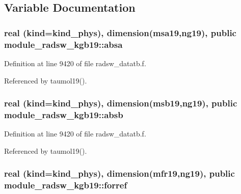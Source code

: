 \subsection{Variable Documentation}
\subsubsection[{\texorpdfstring{absa}{absa}}]{\setlength{\rightskip}{0pt plus 5cm}real (kind=kind\+\_\+phys), dimension({\bf msa19},ng19), public module\+\_\+radsw\+\_\+kgb19\+::absa}\hypertarget{namespacemodule__radsw__kgb19_ad9a6fc80122a2f06d9f2277d74e00c85}{}\label{namespacemodule__radsw__kgb19_ad9a6fc80122a2f06d9f2277d74e00c85}


Definition at line 9420 of file radsw\+\_\+datatb.\+f.



Referenced by taumol19().

\subsubsection[{\texorpdfstring{absb}{absb}}]{\setlength{\rightskip}{0pt plus 5cm}real (kind=kind\+\_\+phys), dimension({\bf msb19},ng19), public module\+\_\+radsw\+\_\+kgb19\+::absb}\hypertarget{namespacemodule__radsw__kgb19_ad1171c012a1615c4b98eb3e95276867d}{}\label{namespacemodule__radsw__kgb19_ad1171c012a1615c4b98eb3e95276867d}


Definition at line 9420 of file radsw\+\_\+datatb.\+f.



Referenced by taumol19().

\subsubsection[{\texorpdfstring{forref}{forref}}]{\setlength{\rightskip}{0pt plus 5cm}real (kind=kind\+\_\+phys), dimension({\bf mfr19},ng19), public module\+\_\+radsw\+\_\+kgb19\+::forref}\hypertarget{namespacemodule__radsw__kgb19_abb4c30ad8e82694b33df78bb2687df6d}{}\label{namespacemodule__radsw__kgb19_abb4c30ad8e82694b33df78bb2687df6d}


